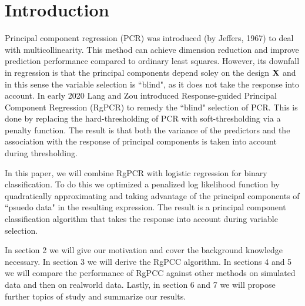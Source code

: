 \documentclass[main.tex]{subfiles}
\begin{document}
\section{Introduction}
Principal component regression (PCR) was introduced (by Jeffers, 1967) to deal with multicollinearity. This method can achieve dimension reduction and improve prediction performance compared to ordinary least squares. However, its downfall in regression is that the principal components depend soley on the design $\mathbf{X}$ and in this sense the variable selection is ``blind", as it does not take the response into account. In early 2020 Lang and Zou \cite{langzou} introduced Response-guided Principal Component Regression (RgPCR) to remedy the ``blind" selection of PCR. This is done by replacing the hard-thresholding of PCR with soft-thresholding via a penalty function. The result is that both the variance of the predictors and the association with the response of principal components is taken into account during thresholding.

In this paper, we will combine RgPCR with logistic regression for binary classification. To do this we optimized a penalized log likelihood function by quadratically approximating and taking advantage of the principal components of ``psuedo data" in the resulting expression. The result is a principal component classification algorithm that takes the response into account during variable selection.

In section 2 we will give our motivation and cover the background knowledge necessary. In section 3 we will derive the RgPCC algorithm. In sections 4 and 5 we will compare the performance of RgPCC against other methods on simulated data and then on realworld data. Lastly, in section 6 and 7 we will propose further topics of study and summarize our results.
\end{document}
